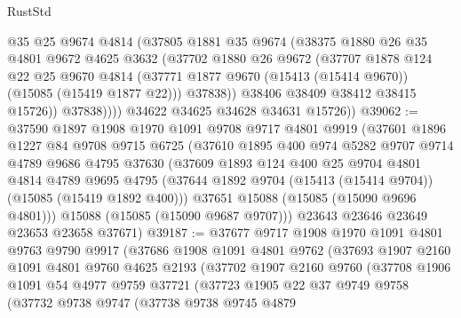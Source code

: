 \begin{lexlean}{RustStd}
\begin{coremodule}
                @35
                @25
                @9674
                @4814
                (@37805
                  @1881
                  @35
                  @9674
                  (@38375
                    @1880
                    @26
                    @35
                    @4801
                    @9672
                    @4625
                    @3632
                    (@37702
                      @1880
                      @26
                      @9672
                      (@37707
                        @1878
                        @124
                        @22
                        @25
                        @9670
                        @4814
                        (@37771 @1877 @9670 (@15413 (@15414 @9670)) (@15085 (@15419 @1877 @22)))
                        @37838))
                    @38406
                    @38409
                    @38412
                    @38415
                    @15726))
                @37838))))
        @34622
        @34625
        @34628
        @34631
        @15726))
@39062 := @37590
    @1897
    @1908
    @1970
    @1091
    @9708
    @9717
    @4801
    @9919
    (@37601
      @1896
      @1227
      @84
      @9708
      @9715
      @6725
      (@37610
        @1895
        @400
        @974
        @5282
        @9707
        @9714
        @4789
        @9686
        @4795
        @37630
        (@37609
          @1893
          @124
          @400
          @25
          @9704
          @4801
          @4814
          @4789
          @9695
          @4795
          (@37644 @1892 @9704 (@15413 (@15414 @9704)) (@15085 (@15419 @1892 @400)))
          @37651
          @15088
          (@15085 (@15090 @9696 @4801)))
        @15088
        (@15085 (@15090 @9687 @9707)))
      @23643
      @23646
      @23649
      @23653
      @23658
      @37671)
@39187 := @37677
    @9717
    @1908
    @1970
    @1091
    @4801
    @9763
    @9790
    @9917
    (@37686
      @1908
      @1091
      @4801
      @9762
      (@37693
        @1907
        @2160
        @1091
        @4801
        @9760
        @4625
        @2193
        (@37702
          @1907
          @2160
          @9760
          (@37708
            @1906
            @1091
            @54
            @4977
            @9759
            @37721
            (@37723
              @1905
              @22
              @37
              @9749
              @9758
              (@37732
                @9738
                @9747
                (@37738
                  @9738
                  @9745
                  @4879

\end{coremodule}
\end{lexlean}
